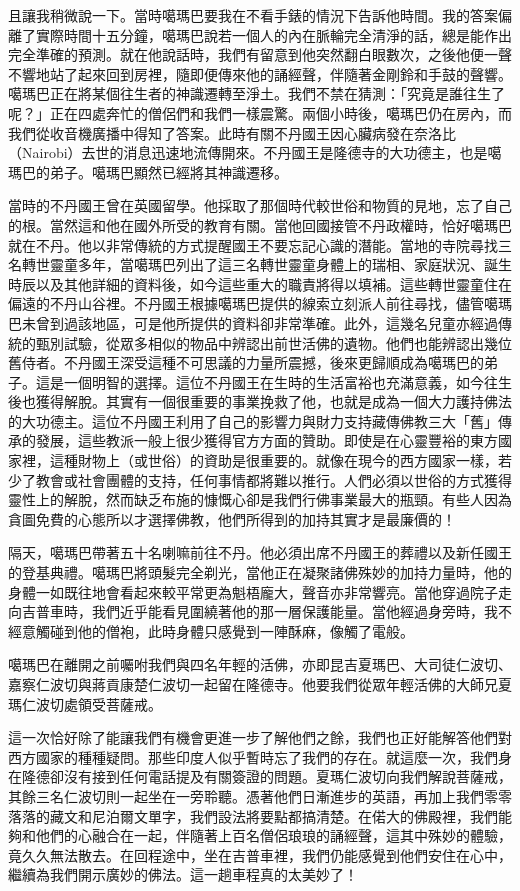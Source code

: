 且讓我稍微說一下。當時噶瑪巴要我在不看手錶的情況下告訴他時間。我的答案偏離了實際時間十五分鐘，噶瑪巴說若一個人的內在脈輪完全清淨的話，總是能作出完全準確的預測。就在他說話時，我們有留意到他突然翻白眼數次，之後他便一聲不響地站了起來回到房裡，隨即便傳來他的誦經聲，伴隨著金剛鈴和手鼓的聲響。噶瑪巴正在將某個往生者的神識遷轉至淨土。我們不禁在猜測：「究竟是誰往生了呢？」正在四處奔忙的僧侶們和我們一樣震驚。兩個小時後，噶瑪巴仍在房內，而我們從收音機廣播中得知了答案。此時有關不丹國王因心臟病發在奈洛比（Nairobi）去世的消息迅速地流傳開來。不丹國王是隆德寺的大功德主，也是噶瑪巴的弟子。噶瑪巴顯然已經將其神識遷移。

當時的不丹國王曾在英國留學。他採取了那個時代較世俗和物質的見地，忘了自己的根。當然這和他在國外所受的教育有關。當他回國接管不丹政權時，恰好噶瑪巴就在不丹。他以非常傳統的方式提醒國王不要忘記心識的潛能。當地的寺院尋找三名轉世靈童多年，當噶瑪巴列出了這三名轉世靈童身體上的瑞相、家庭狀況、誕生時辰以及其他詳細的資料後，如今這些重大的職責將得以填補。這些轉世靈童住在偏遠的不丹山谷裡。不丹國王根據噶瑪巴提供的線索立刻派人前往尋找，儘管噶瑪巴未曾到過該地區，可是他所提供的資料卻非常準確。此外，這幾名兒童亦經過傳統的甄別試驗，從眾多相似的物品中辨認出前世活佛的遺物。他們也能辨認出幾位舊侍者。不丹國王深受這種不可思議的力量所震撼，後來更歸順成為噶瑪巴的弟子。這是一個明智的選擇。這位不丹國王在生時的生活富裕也充滿意義，如今往生後也獲得解脫。其實有一個很重要的事業挽救了他，也就是成為一個大力護持佛法的大功德主。這位不丹國王利用了自己的影響力與財力支持藏傳佛教三大「舊」傳承的發展，這些教派一般上很少獲得官方方面的贊助。即使是在心靈豐裕的東方國家裡，這種財物上（或世俗）的資助是很重要的。就像在現今的西方國家一樣，若少了教會或社會團體的支持，任何事情都將難以推行。人們必須以世俗的方式獲得靈性上的解脫，然而缺乏布施的慷慨心卻是我們行佛事業最大的瓶頸。有些人因為貪圖免費的心態所以才選擇佛教，他們所得到的加持其實才是最廉價的！

隔天，噶瑪巴帶著五十名喇嘛前往不丹。他必須出席不丹國王的葬禮以及新任國王的登基典禮。噶瑪巴將頭髮完全剃光，當他正在凝聚諸佛殊妙的加持力量時，他的身體一如既往地會看起來較平常更為魁梧龐大，聲音亦非常響亮。當他穿過院子走向吉普車時，我們近乎能看見圍繞著他的那一層保護能量。當他經過身旁時，我不經意觸碰到他的僧袍，此時身體只感覺到一陣酥麻，像觸了電般。

噶瑪巴在離開之前囑咐我們與四名年輕的活佛，亦即昆吉夏瑪巴、大司徒仁波切、嘉察仁波切與蔣貢康楚仁波切一起留在隆德寺。他要我們從眾年輕活佛的大師兄夏瑪仁波切處領受菩薩戒。

這一次恰好除了能讓我們有機會更進一步了解他們之餘，我們也正好能解答他們對西方國家的種種疑問。那些印度人似乎暫時忘了我們的存在。就這麼一次，我們身在隆德卻沒有接到任何電話提及有關簽證的問題。夏瑪仁波切向我們解說菩薩戒，其餘三名仁波切則一起坐在一旁聆聽。憑著他們日漸進步的英語，再加上我們零零落落的藏文和尼泊爾文單字，我們設法將要點都搞清楚。在偌大的佛殿裡，我們能夠和他們的心融合在一起，伴隨著上百名僧侶琅琅的誦經聲，這其中殊妙的體驗，竟久久無法散去。在回程途中，坐在吉普車裡，我們仍能感覺到他們安住在心中，繼續為我們開示廣妙的佛法。這一趟車程真的太美妙了！


